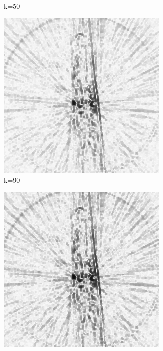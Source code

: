 \documentclass[journal]{IEEEtran}
\begin{document}
\begin{figure}[h]
\begin{subfigure}[b]{0.24\linewidth}
        \caption{k=50}
     \end{subfigure} 
  \begin{subfigure}[b]{0.24\linewidth}
        \includegraphics[width=\textwidth]{../images/okra/2D_okra/weightsIm_90normalized.png}
        \caption{k=90}
     \end{subfigure}
  \begin{subfigure}[b]{0.24\linewidth}
        \includegraphics[width=\textwidth]{../images/okra/2D_okra/weightsIm_130normalized.png}

\end{subfigure}
\end{figure}
\end{document}
